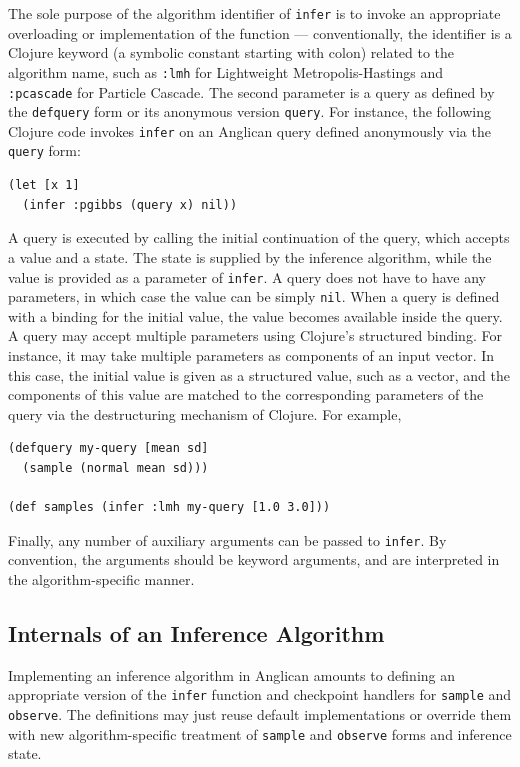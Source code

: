 \documentclass[preprint]{sigplanconf}
\begin{document}
The sole purpose of the algorithm identifier of \texttt{infer} is to invoke
an appropriate overloading or implementation of the function --- conventionally,
the identifier is a Clojure keyword (a symbolic constant starting with colon)
related to the algorithm name, such as \texttt{:lmh} for Lightweight
Metropolis-Hastings and \texttt{:pcascade} for Particle Cascade.
The second parameter is a query as defined by
the \texttt{defquery} form or its anonymous version \texttt{query}. For instance,
the following Clojure code invokes \texttt{infer} on an Anglican query
defined anonymously via the \texttt{query} form:
\begin{lstlisting}[style=default]
(let [x 1]
  (infer :pgibbs (query x) nil))
\end{lstlisting}
A query is executed by calling the initial continuation of the
query, which accepts a value and a state. The state is supplied
by the inference algorithm, while the value is provided as a
parameter of \texttt{infer}. A query does not have to have any
parameters, in which case the value can be simply \texttt{nil}.
When a query is defined with a binding for the initial value,
the value becomes available inside the query. A query may
accept multiple parameters using Clojure's structured binding.
For instance, it may take multiple parameters as components
of an input vector. In this case, the initial value is given
as a structured value, such as a vector, and the components
of this value are matched to the corresponding
parameters of the query via the destructuring mechanism of Clojure.
For example,
\begin{lstlisting}[style=default]
(defquery my-query [mean sd]
  (sample (normal mean sd)))

(def samples (infer :lmh my-query [1.0 3.0]))
\end{lstlisting}
Finally, any number of auxiliary arguments can be
passed to \texttt{infer}.
By convention, the arguments should be
keyword arguments, and are interpreted in the algorithm-specific
manner.

\subsection{Internals of an Inference Algorithm}
\label{sec:internals}

Implementing an inference algorithm in Anglican amounts to
defining an appropriate version of the \texttt{infer} function
and checkpoint handlers for \texttt{sample} and
\texttt{observe}.  The definitions may just reuse default
implementations or override them with new algorithm-specific
treatment of \texttt{sample} and \texttt{observe} forms and
inference state.
\end{document}
